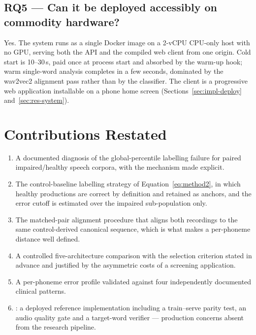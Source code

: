 \subsection*{RQ5 --- Can it be deployed accessibly on commodity hardware?}

Yes. The system runs as a single Docker image on a 2-vCPU CPU-only host with no
GPU, serving both the API and the compiled web client from one origin. Cold
start is 10--30\,s, paid once at process start and absorbed by the warm-up hook;
warm single-word analysis completes in a few seconds, dominated by the wav2vec2
alignment pass rather than by the classifier. The client is a progressive web
application installable on a phone home screen
(Sections~\ref{sec:impl-deploy} and~\ref{sec:res-system}).

\section{Contributions Restated}
\label{sec:conc-contributions}

\begin{enumerate}[label=\textbf{C\arabic*.},leftmargin=1.4cm]
  \item A documented diagnosis of the global-percentile labelling failure for
        paired impaired/healthy speech corpora, with the mechanism made
        explicit.
  \item The control-baseline labelling strategy of
        Equation~\eqref{eq:method2}, in which healthy productions are correct by
        definition and retained as anchors, and the error cutoff is estimated
        over the impaired sub-population only.
  \item The matched-pair alignment procedure that aligns both recordings to the
        same control-derived canonical sequence, which is what makes a
        per-phoneme distance well defined.
  \item A controlled five-architecture comparison with the selection criterion
        stated in advance and justified by the asymmetric costs of a screening
        application.
  \item A per-phoneme error profile validated against four independently
        documented clinical patterns.
  \item \systemName: a deployed reference implementation including a
        train--serve parity test, an audio quality gate and a target-word
        verifier --- production concerns absent from the research pipeline.
\end{enumerate}

